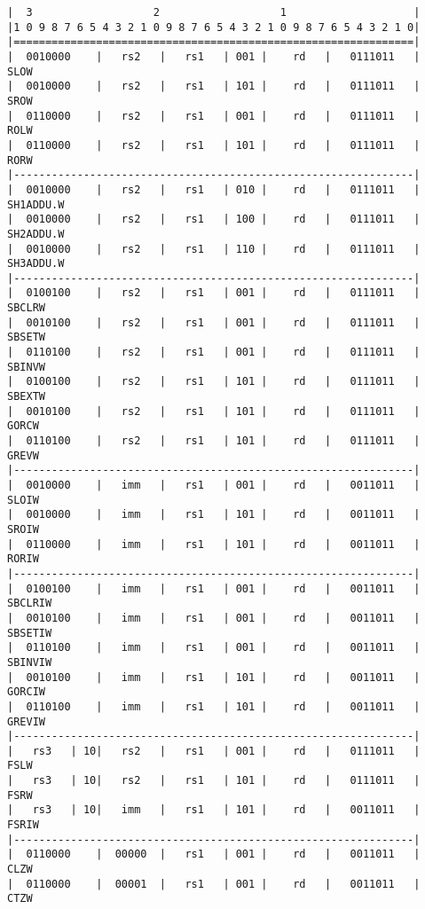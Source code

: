 \begin{minipage}{\linewidth}
\begin{verbatim}
|  3                   2                   1                    |
|1 0 9 8 7 6 5 4 3 2 1 0 9 8 7 6 5 4 3 2 1 0 9 8 7 6 5 4 3 2 1 0|
|===============================================================|
|  0010000    |   rs2   |   rs1   | 001 |    rd   |   0111011   |  SLOW
|  0010000    |   rs2   |   rs1   | 101 |    rd   |   0111011   |  SROW
|  0110000    |   rs2   |   rs1   | 001 |    rd   |   0111011   |  ROLW
|  0110000    |   rs2   |   rs1   | 101 |    rd   |   0111011   |  RORW
|---------------------------------------------------------------|
|  0010000    |   rs2   |   rs1   | 010 |    rd   |   0111011   |  SH1ADDU.W
|  0010000    |   rs2   |   rs1   | 100 |    rd   |   0111011   |  SH2ADDU.W
|  0010000    |   rs2   |   rs1   | 110 |    rd   |   0111011   |  SH3ADDU.W
|---------------------------------------------------------------|
|  0100100    |   rs2   |   rs1   | 001 |    rd   |   0111011   |  SBCLRW
|  0010100    |   rs2   |   rs1   | 001 |    rd   |   0111011   |  SBSETW
|  0110100    |   rs2   |   rs1   | 001 |    rd   |   0111011   |  SBINVW
|  0100100    |   rs2   |   rs1   | 101 |    rd   |   0111011   |  SBEXTW
|  0010100    |   rs2   |   rs1   | 101 |    rd   |   0111011   |  GORCW
|  0110100    |   rs2   |   rs1   | 101 |    rd   |   0111011   |  GREVW
|---------------------------------------------------------------|
|  0010000    |   imm   |   rs1   | 001 |    rd   |   0011011   |  SLOIW
|  0010000    |   imm   |   rs1   | 101 |    rd   |   0011011   |  SROIW
|  0110000    |   imm   |   rs1   | 101 |    rd   |   0011011   |  RORIW
|---------------------------------------------------------------|
|  0100100    |   imm   |   rs1   | 001 |    rd   |   0011011   |  SBCLRIW
|  0010100    |   imm   |   rs1   | 001 |    rd   |   0011011   |  SBSETIW
|  0110100    |   imm   |   rs1   | 001 |    rd   |   0011011   |  SBINVIW
|  0010100    |   imm   |   rs1   | 101 |    rd   |   0011011   |  GORCIW
|  0110100    |   imm   |   rs1   | 101 |    rd   |   0011011   |  GREVIW
|---------------------------------------------------------------|
|   rs3   | 10|   rs2   |   rs1   | 001 |    rd   |   0111011   |  FSLW
|   rs3   | 10|   rs2   |   rs1   | 101 |    rd   |   0111011   |  FSRW
|   rs3   | 10|   imm   |   rs1   | 101 |    rd   |   0011011   |  FSRIW
|---------------------------------------------------------------|
|  0110000    |  00000  |   rs1   | 001 |    rd   |   0011011   |  CLZW
|  0110000    |  00001  |   rs1   | 001 |    rd   |   0011011   |  CTZW

\end{verbatim}
\end{minipage}
